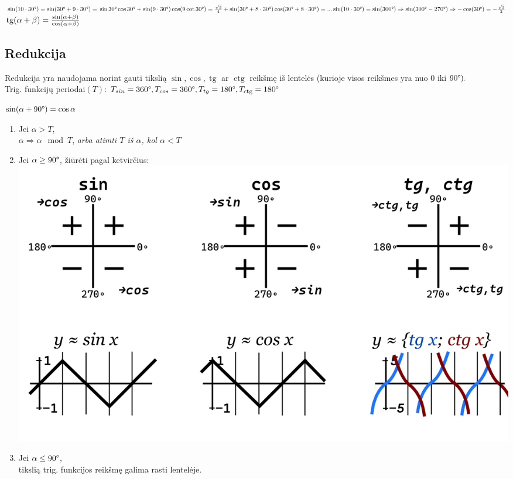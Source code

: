 \documentclass[fleqn]{article} %
\DeclareMathOperator{\tg}{tg}
\DeclareMathOperator{\ctg}{ctg}
\begin{document}
\begin{math}
    \sin(10\cdot 30\degree) = \sin(30\degree + 9 \cdot 30\degree) = \\
    \sin 30\degree \cos 30\degree + \sin(9 \cdot 30\degree)\cos(9 \cot 30\degree) = \\
    \frac{\sqrt{3}}{4} + \sin(30\degree + 8 \cdot 30\degree)\cos(30\degree + 8 \cdot 30\degree) = ... \\ 
    \\
    \sin(10 \cdot 30\degree) = \sin(300\degree) \Rightarrow 
    \sin(300\degree - 270\degree) \Rightarrow -\cos(30\degree) = -\frac{\sqrt{3}}{2}
\end{math} \\

\begin{math} \\
    \tg(\alpha + \beta) = \frac{\sin(\alpha + \beta)}{\cos(\alpha + \beta)}
\end{math}

\subsection{Redukcija}

Redukcija yra naudojama norint gauti tikslią $\sin, \cos, \tg$ ar $\ctg$ reikšmę iš lentelės (kurioje visos reikšmes yra nuo $0$ iki $90\degree).$ \\

Trig. funkcijų periodai$(T)$: $T_{sin} = 360\degree, T_{cos} = 360\degree, T_{tg} = 180\degree, T_{\ctg} = 180\degree $

$\sin(\alpha + 90\degree) = \cos\alpha$
\begin{enumerate}
    \item Jei $\alpha > T$, \\
        $\alpha \Rightarrow \alpha \mod T$, \textit{arba atimti $T$ iš $\alpha$, kol $\alpha < T$}
    \item Jei $\alpha \ge 90\degree$, žiūrėti pagal ketvirčius: \\
        \includegraphics[scale=0.25]{assets/reduction.png} 
    \item Jei $\alpha \le 90\degree$, \\
        tikslią trig. funkcijos reikšmę galima rasti lentelėje.

\end{enumerate}
\end{document}
